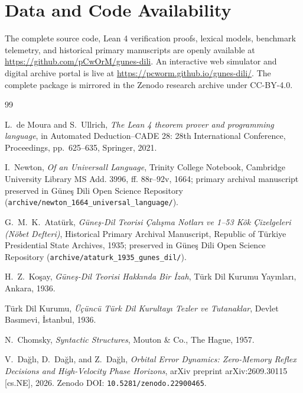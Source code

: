 \documentclass[11pt,a4paper]{article}
\begin{document}
\section*{Data and Code Availability}

The complete source code, Lean 4 verification proofs, lexical models, benchmark telemetry, and historical primary manuscripts are openly available at \url{https://github.com/pCwOrM/gunes-dili}. An interactive web simulator and digital archive portal is live at \url{https://pcworm.github.io/gunes-dili/}. The complete package is mirrored in the Zenodo research archive under CC-BY-4.0.

\begin{thebibliography}{99}

L.~de Moura and S.~Ullrich,
\textit{The Lean 4 theorem prover and programming language},
in Automated Deduction--CADE 28: 28th International Conference, Proceedings, pp.~625--635, Springer, 2021.

I.~Newton,
\textit{Of an Universall Language},
Trinity College Notebook, Cambridge University Library MS Add. 3996, ff. 88r--92v, 1664; primary archival manuscript preserved in G\"{u}ne\c{s} Dili Open Science Repository (\texttt{archive/newton\_1664\_universal\_language/}).

G.~M.~K.~Atat\"{u}rk,
\textit{G\"{u}ne\c{s}-Dil Teorisi \c{C}al\i\c{s}ma Notlar\i{} ve 1--53 K\"{o}k \c{C}izelgeleri (N\"{o}bet Defteri)},
Historical Primary Archival Manuscript, Republic of T\"{u}rkiye Presidential State Archives, 1935; preserved in G\"{u}ne\c{s} Dili Open Science Repository (\texttt{archive/ataturk\_1935\_gunes\_dil/}).

H.~Z.~Ko\c{s}ay,
\textit{G\"{u}ne\c{s}-Dil Teorisi Hakk\i{}nda Bir \.{I}zah},
T\"{u}rk Dil Kurumu Yay\i{}nlar\i, Ankara, 1936.

T\"{u}rk Dil Kurumu,
\textit{\"{U}\c{c}\"{u}nc\"{u} T\"{u}rk Dil Kurultay\i{} Tezler ve Tutanaklar},
Devlet Bas\i{}mevi, \.{I}stanbul, 1936.

N.~Chomsky,
\textit{Syntactic Structures},
Mouton \& Co., The Hague, 1957.

V.~Da\u{g}l\i, D.~Da\u{g}l\i, and Z.~Da\u{g}l\i,
\textit{Orbital Error Dynamics: Zero-Memory Reflex Decisions and High-Velocity Phase Horizons},
arXiv preprint arXiv:2609.30115 [cs.NE], 2026. Zenodo DOI: \texttt{10.5281/zenodo.22900465}.


\end{thebibliography}
\end{document}
